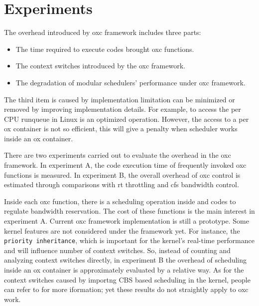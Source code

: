 \chapter{Experiments\label{chap:exp}}

The overhead introduced by oxc framework includes three parts:
\begin{itemize}
\item The time required to execute codes brought oxc functions.
\item The context switches introduced by the oxc framework.
\item The degradation of modular schedulers' performance under oxc 
	framework.
\end{itemize}

The third item is caused by implementation limitation can be minimized 
or removed by improving implementation details. For example, to access 
the per CPU runqueue in Linux is an optimized operation. However, the 
access to a per ox container is not so efficient, this will give a 
penalty when scheduler works inside an ox container.

There are two experiments carried out to evaluate the overhead in the 
oxc framework. In experiment A, the code execution time of frequently 
invoked oxc functions is measured. In experiment B, the overall overhead 
of oxc control is estimated through comparisons with rt throttling and 
cfs bandwidth control.

Inside each oxc function, there is a scheduling operation inside and
codes to regulate bandwidth reservation. The cost of these functions 
is the main interest in experiment A. Current oxc framework 
implementation is still a prototype. Some kernel features are not 
considered under the framework yet. For instance, the 
\texttt{priority inheritance}, which is important for the kernel's 
real-time performance and will influence number of context switches. 
So, instead of counting and analyzing context switches directly,
in experiment B the overhead of scheduling inside an ox container is
approximately evaluated by a relative way. As for the context switches 
caused by importng CBS based scheduling in the kernel, people can refer  
to \cite{Luigi09} for more iformation; yet these results do not straightly 
apply to oxc work. 

